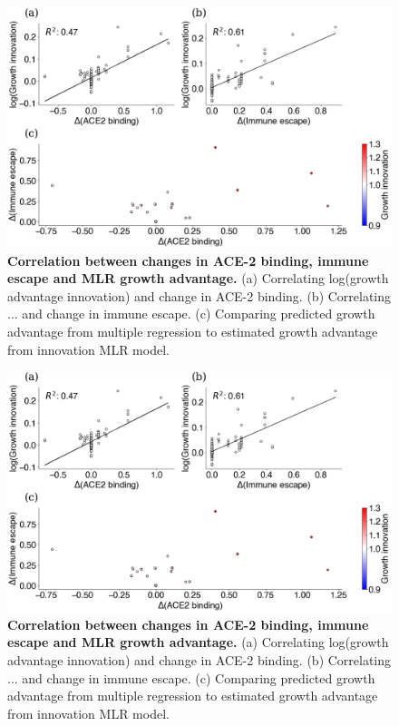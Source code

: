 \documentclass[12pt,oneside,letterpaper]{article}
\begin{document}
\begin{figure}[h]
	\centering
	\includegraphics[width=1.0\textwidth]{figures/binding-escape-score-growth-advantage-innovations}
	\caption{\textbf{Correlation between changes in ACE-2 binding, immune escape and MLR growth advantage.}
        (a) Correlating log(growth advantage innovation) and change in ACE-2 binding. 
        (b) Correlating ... and change in immune escape.
        (c) Comparing predicted growth advantage from multiple regression to estimated growth advantage from innovation MLR model.
	}
	\label{binding-escape-score-growth-advantage-innovations}
\end{figure}

\begin{figure}[h]
	\centering
	\includegraphics[width=1.0\textwidth]{figures/binding-escape-score-growth-advantage-innovations}
	\caption{\textbf{Correlation between changes in ACE-2 binding, immune escape and MLR growth advantage.}
        (a) Correlating log(growth advantage innovation) and change in ACE-2 binding. 
        (b) Correlating ... and change in immune escape.
        (c) Comparing predicted growth advantage from multiple regression to estimated growth advantage from innovation MLR model.
	}
	\label{binding-escape-score-growth-advantage-innovations-2}
\end{figure}
\end{document}

